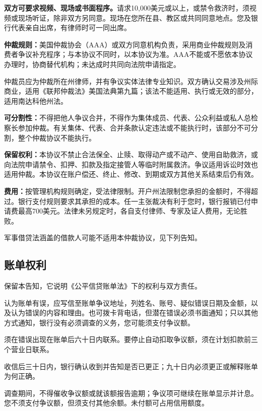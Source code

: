 \documentclass[UTF8,fontset=none,11pt,a4paper]{ctexart}
\begin{document}
\textbf{双方可要求视频、现场或书面程序。}请求10,000美元或以上，或禁令救济时，须视频或现场听证，除非双方另同意。现场在您所在县、教区或共同同意地点。您及银行代表亲自出席，有律师时可\allowbreak\mbox{一同出席。}


\textbf{仲裁规则：}美国仲裁协会（AAA）或双方同意机构负责，采用商业仲裁规则及消费者争议补充程序；与本协议不同时，以本协议为准。AAA不能或不愿依本协议办理时，协商替代机构；未达成时共同向法院\allowbreak\mbox{申请指定。}


仲裁员应为仲裁所在州律师，并有争议实体法律专业知识。双方确认交易涉及州际商业，适用《联邦仲裁法》美国法典第九篇；该法不能适用、执行或无效的部分，适用南达\allowbreak\mbox{科他州法。}


\textbf{可分割性：}不得把他人争议合并，不得作为集体成员、代表、公众利益或私人总检察长参加仲裁。有关集体、代表、合并条款认定违法或不能执行时，该部分不可分割，整个仲裁协议\allowbreak\mbox{不能执行。}


\textbf{保留权利：}本协议不禁止合法保全、止赎、取得动产或不动产、使用自助救济，或向法院申请禁令、扣押、扣款及指定接管人等临时附属救济。争议适用诉讼时效也适用仲裁。本协议在账户偿还、终止、修改、到期或双方其他关系结束\allowbreak\mbox{后仍有效。}


\textbf{费用：}按管理机构规则确定，受法律限制。开户州法限制您承担的金额时，不得超过。银行支付规则要求其承担的成本。任一主张裁决有利于您时，银行报销已付申请费最高700美元。法律未另规定时，各自支付律师、专家及证人费用，\allowbreak\mbox{无论胜败。}


军事借贷法涵盖的借款人可能不适用本仲裁协议，见\allowbreak\mbox{下列告知。}


\subsection*{账单权利}
保留本告知，它说明《公平信贷账单法》下的权利与\allowbreak\mbox{双方责任。}


认为账单有误，应写信至账单争议地址，列姓名、账号、疑似错误日期及金额，以及认为错误的内容和理由。也可拨卡背电话，但潜在错误必须书面通知；只以其他方式通知，银行没有必须调查的义务，您可能须支\allowbreak\mbox{付争议额。}


须在错误出现在账单后六十日内联系。要停止自动扣取争议额，须在计划扣款前三个营\allowbreak\mbox{业日联系。}


收信后三十日内，银行确认收到并告知是否已更正；九十日内必须更正或解释账单\allowbreak\mbox{为何正确。}


调查期间，不得催收争议额或就该额报告逾期；争议项可继续在账单显示并计息。您不须支付争议额，但须支付其他余额。未付额可占用\allowbreak\mbox{信用额度。}
\end{document}
